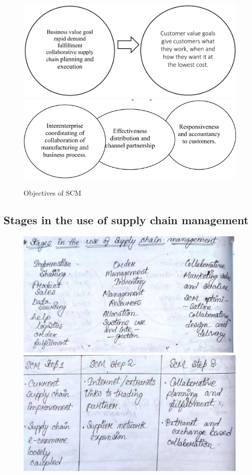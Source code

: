 \documentclass[twocolumn, 12pt, a4paper]{article}
\begin{document}
\begin{figure}[ht]
  \includegraphics[width=\columnwidth]{objectivescm}
  \includegraphics[width=\columnwidth]{objectivescm2}
  \caption{Objectives of SCM}
\end{figure}

\subsection{Stages in the use of supply chain management}
\begin{figure}[ht]
  \includegraphics[width=\columnwidth]{stagesofscm}
\end{figure}
\end{document}
